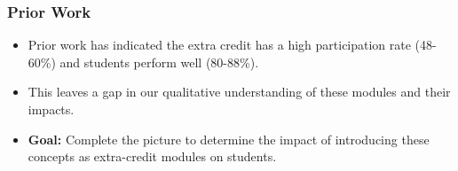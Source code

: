 \documentclass{beamer}
\begin{document}
\begin{frame}
    \frametitle{Prior Work}

    \begin{itemize}
      \item Prior work has indicated the extra credit has a high participation rate (48-60\%) and students perform well (80-88\%). \\ \vspace{0.25cm}
      \item This leaves a gap in our qualitative understanding of these modules and their impacts. \\ \vspace{0.25cm}
      \item \textbf{Goal:} Complete the picture to determine the impact of introducing these concepts as extra-credit modules on students.
    \end{itemize}
\end{frame}
\end{document}
